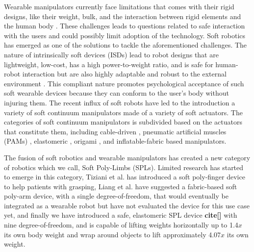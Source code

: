 \documentclass[letterpaper, 10 pt, conference]{ieeeconf}  %
\begin{document}
Wearable manipulators currently face limitations that comes with their rigid designs, like their weight, bulk, and the interaction between rigid elements and the human body \cite{delAma2012}. These challenges leads to questions related to safe interaction with the users and could possibly limit adoption of the technology. Soft robotics has emerged as one of the solutions to tackle the aforementioned challenges. The nature of intrinsically soft devices (ISDs) lead to robot designs that are lightweight, low-cost, has a high power-to-weight ratio, and is safe for human-robot interaction but are also highly adaptable and robust to the external environment \cite{polygerinos2016}. This compliant nature promotes psychological acceptance of such soft wearable devices because they can conform to the user's body without injuring them. The recent influx of soft robots have led to the introduction a variety of soft continuum manipulators made of a variety of soft actuators. The categories of soft continuum manipulators is subdivided based on the actuators that constitute them, including cable-driven \cite{mcMahan2005,calisti2011}, pneumatic artificial muscles (PAMs) \cite{walker2005,godage2016,yasmin2017,giannaccini2017}, elastomeric \cite{cianchetti2013,marchese2015,robertson2017,gong2018}, origami \cite{santoso2017}, and inflatable-fabric \cite{sanan2013,hawkes2017,ohta2017,best2016,liang2018,takeichi2017,kim2018,liang2017c} based manipulators. 

The fusion of soft robotics and wearable manipulators has created a new category of robotics which we call, Soft Poly-Limbs (SPLs). Limited research has started to emerge in this category, Tiziani et al. \cite{tiziani2017} has introduced a soft poly-finger device to help patients with grasping, Liang et al. \cite{liang2017c} have suggested a fabric-based soft poly-arm device, with a single degree-of-freedom, that would eventually be integrated as a wearable robot but have not evaluated the device for this use case yet, and finally we have introduced a safe, elastomeric SPL device \textbf{cite[]} with nine degree-of-freedom, and is capable of lifting weights horizontally up to 1.4$x$ its own body weight and wrap around objects to lift approximately 4.07$x$ its own weight. 
\end{document}
